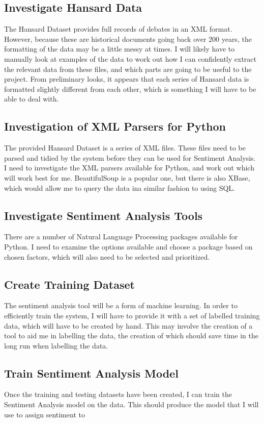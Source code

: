 \documentclass[11pt,fleqn,twoside]{article}
\begin{document}
\subsection{Investigate Hansard Data}
The Hansard Dataset provides full records of debates in an XML format. However, because these are historical documents going back over 200 years, the formatting of the data may be a little messy at times. I will likely have to manually look at examples of the data to work out how I can confidently extract the relevant data from these files, and which parts are going to be useful to the project. From preliminary looks, it appears that each series of Hansard data is formatted slightly different from each other, which is something I will have to be able to deal with.
\subsection{Investigation of XML Parsers for Python}
The provided Hansard Dataset is a series of XML files. These files need to be parsed and tidied by the system before they can be used for Sentiment Analysis. I need to investigate the XML parsers available for Python, and work out which will work best for me. BeautifulSoup is a popular one, but there is also XBase, which would allow me to query the data ina  similar fashion to using SQL.
\subsection{Investigate Sentiment Analysis Tools}
There are a number of Natural Language Processing packages available for Python. I need to examine the options available and choose a package based on chosen factors, which will also need to be selected and prioritized.
\subsection{Create Training Dataset}
The sentiment analysis tool will be a form of machine learning. In order to efficiently train the system, I will have to provide it with a set of labelled training data, which will have to be created by hand. This may involve the creation of a tool to aid me in labelling the data,
the creation of which should save time in the long run when labelling the data.
\subsection{Train Sentiment Analysis Model}
Once the training and testing datasets have been created, I can train the Sentiment Analysis model on the data. This should produce the model that I will use to assign sentiment to 
\end{document}
